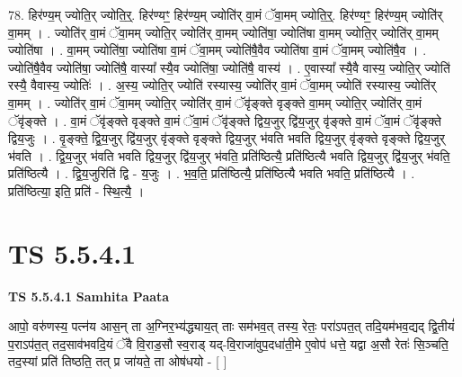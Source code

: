 \documentclass[17pt]{extarticle}
\begin{document}
78. हिर॑ण्य॒म् ज्योति॒र् ज्योति॒र्॒. हिर॑ण्यꣳ॒॒ हिर॑ण्य॒म् ज्योति॑र् वा॒मं ॅवा॒मम् ज्योति॒र्॒. हिर॑ण्यꣳ॒॒ हिर॑ण्य॒म् ज्योति॑र् वा॒मम् । . ज्योति॑र् वा॒मं ॅवा॒मम् ज्योति॒र् ज्योति॑र् वा॒मम् ज्योति॑षा॒ ज्योति॑षा वा॒मम् ज्योति॒र् ज्योति॑र् वा॒मम् ज्योति॑षा । . वा॒मम् ज्योति॑षा॒ ज्योति॑षा वा॒मं ॅवा॒मम् ज्योति॑षै॒वैव ज्योति॑षा वा॒मं ॅवा॒मम् ज्योति॑षै॒व । . ज्योति॑षै॒वैव ज्योति॑षा॒ ज्योति॑षै॒ वास्या᳚ स्यै॒व ज्योति॑षा॒ ज्योति॑षै॒ वास्य॑ । . ए॒वास्या᳚ स्यै॒वै वास्य॒ ज्योति॒र् ज्योति॑ रस्यै॒ वैवास्य॒ ज्योतिः॑ । . अ॒स्य॒ ज्योति॒र् ज्योति॑ रस्यास्य॒ ज्योति॑र् वा॒मं ॅवा॒मम् ज्योति॑ रस्यास्य॒ ज्योति॑र् वा॒मम् । . ज्योति॑र् वा॒मं ॅवा॒मम् ज्योति॒र् ज्योति॑र् वा॒मं ॅवृ॑ङ्क्ते वृङ्क्ते वा॒मम् ज्योति॒र् ज्योति॑र् वा॒मं ॅवृ॑ङ्क्ते । . वा॒मं ॅवृ॑ङ्क्ते वृङ्क्ते वा॒मं ॅवा॒मं ॅवृ॑ङ्क्ते द्विय॒जुर् द्वि॑य॒जुर् वृ॑ङ्क्ते वा॒मं ॅवा॒मं ॅवृ॑ङ्क्ते द्विय॒जुः । . वृ॒ङ्क्ते॒ द्वि॒य॒जुर् द्वि॑य॒जुर् वृ॑ङ्क्ते वृङ्क्ते द्विय॒जुर् भ॑वति भवति द्विय॒जुर् वृ॑ङ्क्ते वृङ्क्ते द्विय॒जुर् भ॑वति । . द्वि॒य॒जुर् भ॑वति भवति द्विय॒जुर् द्वि॑य॒जुर् भ॑वति॒ प्रति॑ष्ठित्यै॒ प्रति॑ष्ठित्यै भवति द्विय॒जुर् द्वि॑य॒जुर् भ॑वति॒ प्रति॑ष्ठित्यै । . द्वि॒य॒जुरिति॑ द्वि - य॒जुः । . भ॒व॒ति॒ प्रति॑ष्ठित्यै॒ प्रति॑ष्ठित्यै भवति भवति॒ प्रति॑ष्ठित्यै । . प्रति॑ष्ठित्या॒ इति॒ प्रति॑ - स्थि॒त्यै॒ । \newline
\pagebreak
{}

\section{ TS 5.5.4.1 }

\textbf{TS 5.5.4.1 } \newline
\textbf{Samhita Paata} \newline

आपो॒ वरु॑णस्य॒ पत्न॑य आस॒न् ता अ॒ग्निर॒भ्य॑द्ध्याय॒त् ताः सम॑भव॒त् तस्य॒ रेतः॒ परा॑ऽपत॒त् तदि॒यम॑भव॒द्यद् द्वि॒तीयं॑ प॒राऽप॑त॒त् तद॒साव॑भवदि॒यं ॅवै वि॒राड॒सौ स्व॒राड् यद्-वि॒राजा॑वुप॒दधा॑ती॒मे ए॒वोप॑ धत्ते॒ यद्वा अ॒सौ रेतः॑ सि॒ञ्चति॒ तद॒स्यां प्रति॑ तिष्ठति॒ तत् प्र जा॑यते॒ ता ओष॑धयो - [  ] \newline
\end{document}
